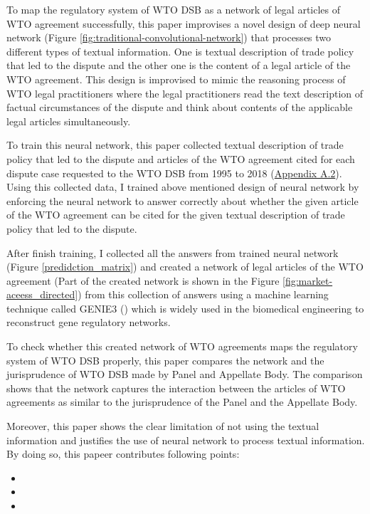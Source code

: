 To map the regulatory system of WTO DSB as 
a network of legal articles of WTO agreement 
successfully,
this paper improvises 
a novel design of deep neural network (Figure \ref{fig:traditional-convolutional-network}) that
processes two different types of textual information.
One is textual description of trade policy that led to the dispute and
the other one is the content of a legal article of the WTO agreement.
This design is improvised to mimic
the reasoning process of WTO legal practitioners
where the legal practitioners read
the text description of
factual circumstances of the dispute and think about contents of
the applicable legal articles simultaneously.


To train this neural network, this paper collected textual description of trade policy 
that led to the dispute and articles of the WTO agreement cited for each dispute
case requested to the WTO DSB 
from 1995 to 2018 (\hyperref[sub:cited-articles-table]{Appendix A.2}).
Using this collected data, I trained above mentioned design of neural network by enforcing the neural network to answer correctly 
about whether the given article of the WTO agreement
can be cited for the given textual description of 
trade policy that led to the dispute.

After finish training, I collected all the answers from trained neural network (Figure \ref{predidction_matrix})
and created a network of legal articles of the WTO agreement (Part of the created network is shown in the Figure \ref{fig:market-aceess_directed}) 
from this collection of answers using a machine learning technique called GENIE3 (\citep{genie3}) 
which is widely used in the biomedical engineering to reconstruct gene regulatory networks.

To check whether this created network of WTO agreements maps the regulatory system of WTO DSB properly, this paper
compares the network and the jurisprudence of WTO DSB made by Panel and Appellate Body. 
The comparison shows that the network captures the interaction between the articles of WTO agreements
as similar to the jurisprudence of the Panel and the Appellate Body.

Moreover, this paper shows the clear limitation of not using the textual information 
and justifies the use of neural network to process textual information.
By doing so, this papeer contributes following points:
\begin{itemize}
  \item
  \item
  \item
\end{itemize}


